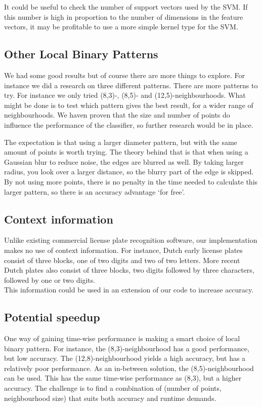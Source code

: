 \documentclass[a4paper]{article}
\begin{document}
It could be useful to check the number of support vectors used by the SVM. If
this number is high in proportion to the number of dimensions in the feature
vectors, it may be profitable to use a more simple kernel type for the SVM.

\subsection{Other Local Binary Patterns}

We had some good results but of course there are more things to explore.
For instance we did a research on three different patterns. There are more
patterns to try. For instance we only tried (8,3)-, (8,5)- and
(12,5)-neighbourhoods. What might be done is to test which pattern gives the
best result, for a wider range of neighbourhoods. We haven proven that the size
and number of points do influence the performance of the classifier, so further
research would be in place.

The expectation is that using a larger diameter pattern, but with the same
amount of points is worth trying. The theory behind that is that when using a
Gaussian blur to reduce noise, the edges are blurred as well. By taking larger
radius, you look over a larger distance, so the blurry part of the edge is
skipped. By not using more points, there is no penalty in the time needed to
calculate this larger pattern, so there is an accuracy advantage `for free'.

\subsection{Context information}

Unlike existing commercial license plate recognition software, our
implementation makes no use of context information. For instance, Dutch early
license plates consist of three blocks, one of two digits and two of two
letters. More recent Dutch plates also consist of three blocks, two digits
followed by three characters, followed by one or two digits. \\
This information could be used in an extension of our code to increase
accuracy.

\subsection{Potential speedup}

One way of gaining time-wise performance is making a smart choice of local
binary pattern. For instance, the (8,3)-neighbourhood has a good performance,
but low accuracy. The (12,8)-neighbourhood yields a high accuracy, but has a
relatively poor performance. As an in-between solution, the (8,5)-neighbourhood
can be used. This has the same time-wise performance as (8,3), but a higher
accuracy. The challenge is to find a combination of (number of points,
neighbourhood size) that suits both accuracy and runtime demands.
\end{document}
